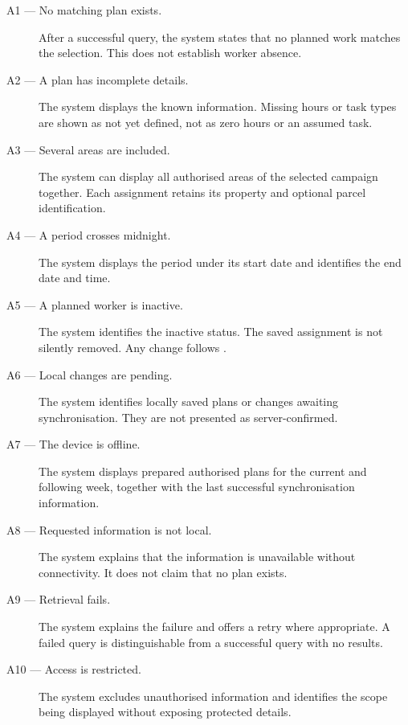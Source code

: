 \begin{description}

    \item[A1 --- No matching plan exists.]
    After a successful query, the system states
    that no planned work matches the selection.
    This does not establish worker absence.

    \item[A2 --- A plan has incomplete details.]
    The system displays the known information.
    Missing hours or task types are shown
    as not yet defined, not as zero hours
    or an assumed task.

    \item[A3 --- Several areas are included.]
    The system can display all authorised
    areas of the selected campaign together.
    Each assignment retains its property
    and optional parcel identification.

    \item[A4 --- A period crosses midnight.]
    The system displays the period under
    its start date and identifies
    the end date and time.

    \item[A5 --- A planned worker is inactive.]
    The system identifies the inactive status.
    The saved assignment is not silently removed.
    Any change follows .

    \item[A6 --- Local changes are pending.]
    The system identifies locally saved plans
    or changes awaiting synchronisation.
    They are not presented as server-confirmed.

    \item[A7 --- The device is offline.]
    The system displays prepared authorised
    plans for the current and following week,
    together with the last successful
    synchronisation information.

    \item[A8 --- Requested information is not local.]
    The system explains that the information
    is unavailable without connectivity.
    It does not claim that no plan exists.

    \item[A9 --- Retrieval fails.]
    The system explains the failure
    and offers a retry where appropriate.
    A failed query is distinguishable
    from a successful query with no results.

    \item[A10 --- Access is restricted.]
    The system excludes unauthorised information
    and identifies the scope being displayed
    without exposing protected details.

\end{description}

